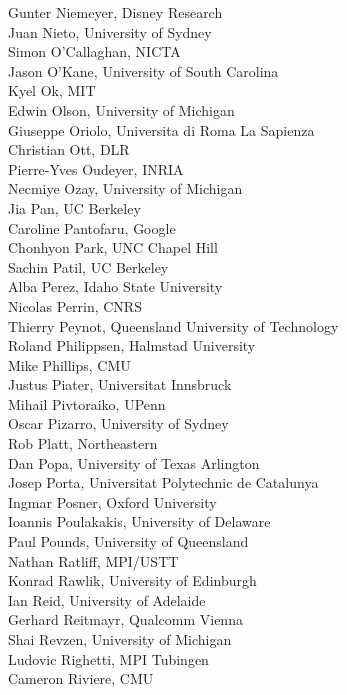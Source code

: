\begin{multicols}{3}
{Gunter Niemeyer, Disney Research\\
Juan Nieto, University of Sydney\\
Simon O'Callaghan, NICTA\\
Jason O'Kane, University of South Carolina\\
Kyel Ok, MIT\\
Edwin Olson, University of Michigan\\
Giuseppe Oriolo, Universita di Roma La Sapienza\\
Christian Ott, DLR\\
Pierre-Yves Oudeyer, INRIA\\
Necmiye Ozay, University of Michigan\\
Jia Pan, UC Berkeley\\
Caroline Pantofaru, Google\\
Chonhyon Park, UNC Chapel Hill\\
Sachin Patil, UC Berkeley\\
Alba Perez, Idaho State University\\
Nicolas Perrin, CNRS\\
Thierry Peynot, Queensland University of Technology\\
Roland Philippsen, Halmstad University\\
Mike Phillips, CMU\\
Justus Piater, Universitat Innsbruck\\
Mihail Pivtoraiko, UPenn\\
Oscar Pizarro, University of Sydney\\
Rob Platt, Northeastern\\
Dan Popa, University of Texas Arlington\\
Josep Porta, Universitat Polytechnic de Catalunya\\
Ingmar Posner, Oxford University\\
Ioannis Poulakakis, University of Delaware\\
Paul Pounds, University of Queensland\\
Nathan Ratliff, MPI/USTT\\
Konrad Rawlik, University of Edinburgh\\
Ian Reid, University of Adelaide\\
Gerhard Reitmayr, Qualcomm Vienna\\
Shai Revzen, University of Michigan\\
Ludovic Righetti, MPI Tubingen\\
Cameron Riviere, CMU\\
}
\end{multicols}
